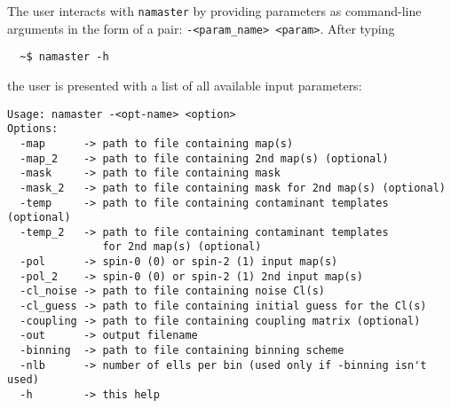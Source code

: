 \documentclass[a4paper,10pt]{article}
\begin{document}
The user interacts with {\tt namaster} by providing parameters as command-line arguments in the form of a pair: {\tt -<param\_name> <param>}. After typing
\begin{verbatim}
  ~$ namaster -h
\end{verbatim}
the user is presented with a list of all available input parameters:
\begin{verbatim}
Usage: namaster -<opt-name> <option>
Options:
  -map      -> path to file containing map(s)
  -map_2    -> path to file containing 2nd map(s) (optional)
  -mask     -> path to file containing mask
  -mask_2   -> path to file containing mask for 2nd map(s) (optional)
  -temp     -> path to file containing contaminant templates (optional)
  -temp_2   -> path to file containing contaminant templates
               for 2nd map(s) (optional)
  -pol      -> spin-0 (0) or spin-2 (1) input map(s)
  -pol_2    -> spin-0 (0) or spin-2 (1) 2nd input map(s)
  -cl_noise -> path to file containing noise Cl(s)
  -cl_guess -> path to file containing initial guess for the Cl(s)
  -coupling -> path to file containing coupling matrix (optional)
  -out      -> output filename
  -binning  -> path to file containing binning scheme
  -nlb      -> number of ells per bin (used only if -binning isn't used)
  -h        -> this help
\end{verbatim}
\end{document}
